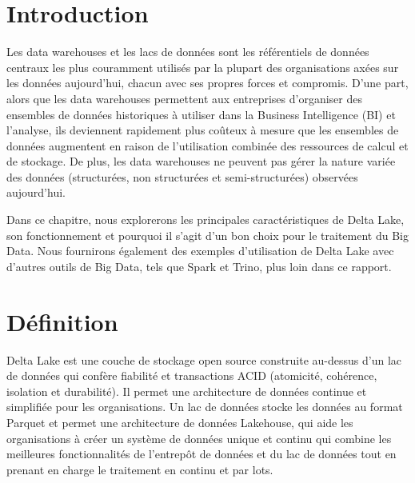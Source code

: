 \section*{Introduction}

Les data warehouses et les lacs de données sont les référentiels de données centraux les plus couramment utilisés par la plupart des organisations axées sur les données aujourd'hui, chacun avec ses propres forces et compromis. D'une part, alors que les data warehouses permettent aux entreprises d'organiser des ensembles de données historiques à utiliser dans la Business Intelligence (BI) et l'analyse, ils deviennent rapidement plus coûteux à mesure que les ensembles de données augmentent en raison de l'utilisation combinée des ressources de calcul et de stockage. De plus, les data warehouses ne peuvent pas gérer la nature variée des données (structurées, non structurées et semi-structurées) observées aujourd'hui.

Dans ce chapitre, nous explorerons les principales caractéristiques de Delta Lake, son fonctionnement et pourquoi il s'agit d'un bon choix pour le traitement du Big Data. Nous fournirons également des exemples d'utilisation de Delta Lake avec d'autres outils de Big Data, tels que Spark et Trino, plus loin dans ce rapport.
\section{Définition}
Delta Lake est une couche de stockage open source construite au-dessus d'un lac de données qui confère fiabilité et transactions ACID (atomicité, cohérence, isolation et durabilité). Il permet une architecture de données continue et simplifiée pour les organisations. Un lac de données stocke les données au format Parquet et permet une architecture de données Lakehouse, qui aide les organisations à créer un système de données unique et continu qui combine les meilleures fonctionnalités de l'entrepôt de données et du lac de données tout en prenant en charge le traitement en continu et par lots.

